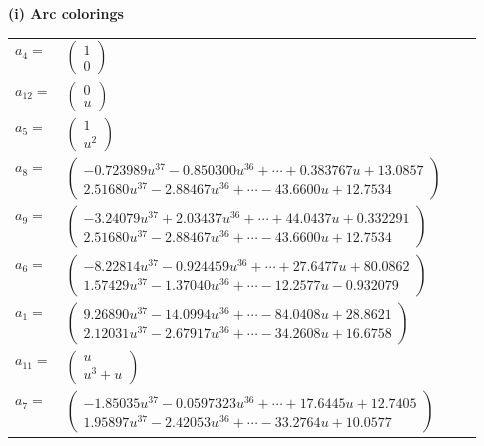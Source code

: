 \documentclass[1p]{elsarticle_modified}
\theoremstyle{definition}
\begin{document}
\flushleft \textbf{(i) Arc colorings}\\
\begin{tabular}{m{7pt} m{180pt} m{7pt} m{180pt} }
\flushright $a_{4}=$&$\begin{pmatrix}1\\0\end{pmatrix}$ \\
\flushright $a_{12}=$&$\begin{pmatrix}0\\u\end{pmatrix}$ \\
\flushright $a_{5}=$&$\begin{pmatrix}1\\u^2\end{pmatrix}$ \\
\flushright $a_{8}=$&$\begin{pmatrix}-0.723989 u^{37}-0.850300 u^{36}+\cdots+0.383767 u+13.0857\\2.51680 u^{37}-2.88467 u^{36}+\cdots-43.6600 u+12.7534\end{pmatrix}$ \\
\flushright $a_{9}=$&$\begin{pmatrix}-3.24079 u^{37}+2.03437 u^{36}+\cdots+44.0437 u+0.332291\\2.51680 u^{37}-2.88467 u^{36}+\cdots-43.6600 u+12.7534\end{pmatrix}$ \\
\flushright $a_{6}=$&$\begin{pmatrix}-8.22814 u^{37}-0.924459 u^{36}+\cdots+27.6477 u+80.0862\\1.57429 u^{37}-1.37040 u^{36}+\cdots-12.2577 u-0.932079\end{pmatrix}$ \\
\flushright $a_{1}=$&$\begin{pmatrix}9.26890 u^{37}-14.0994 u^{36}+\cdots-84.0408 u+28.8621\\2.12031 u^{37}-2.67917 u^{36}+\cdots-34.2608 u+16.6758\end{pmatrix}$ \\
\flushright $a_{11}=$&$\begin{pmatrix}u\\u^3+u\end{pmatrix}$ \\
\flushright $a_{7}=$&$\begin{pmatrix}-1.85035 u^{37}-0.0597323 u^{36}+\cdots+17.6445 u+12.7405\\1.95897 u^{37}-2.42053 u^{36}+\cdots-33.2764 u+10.0577\end{pmatrix}$ \\

\end{tabular}
\end{document}
